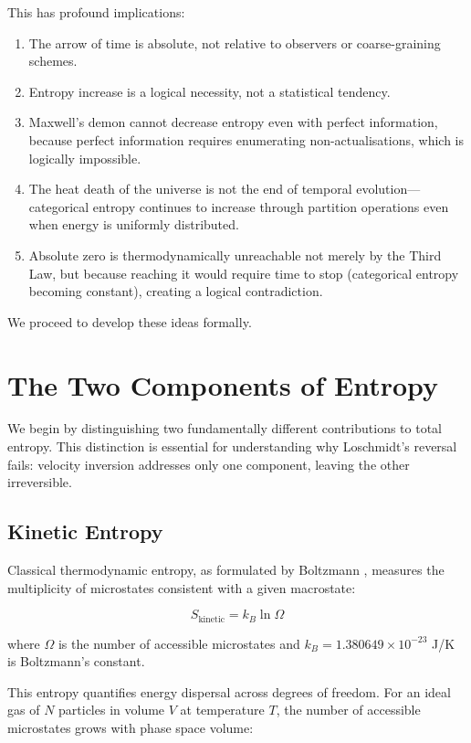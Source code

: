 \documentclass[twocolumn,10pt]{article}
\theoremstyle{definition}
\theoremstyle{remark}
\begin{document}
This has profound implications:

\begin{enumerate}
\item The arrow of time is absolute, not relative to observers or coarse-graining schemes.
\item Entropy increase is a logical necessity, not a statistical tendency.
\item Maxwell's demon \cite{maxwell1871} cannot decrease entropy even with perfect information, because perfect information requires enumerating non-actualisations, which is logically impossible.
\item The heat death of the universe is not the end of temporal evolution—categorical entropy continues to increase through partition operations even when energy is uniformly distributed.
\item Absolute zero is thermodynamically unreachable not merely by the Third Law, but because reaching it would require time to stop (categorical entropy becoming constant), creating a logical contradiction.
\end{enumerate}

We proceed to develop these ideas formally.

\section{The Two Components of Entropy}
\label{sec:two_entropies}

We begin by distinguishing two fundamentally different contributions to total entropy. This distinction is essential for understanding why Loschmidt's reversal fails: velocity inversion addresses only one component, leaving the other irreversible.

\subsection{Kinetic Entropy}

Classical thermodynamic entropy, as formulated by Boltzmann \cite{boltzmann1877}, measures the multiplicity of microstates consistent with a given macrostate:

$$
S_{\text{kinetic}} = k_B \ln \Omega
$$

where $\Omega$ is the number of accessible microstates and $k_B = 1.380649 \times 10^{-23}$ J/K is Boltzmann's constant.

This entropy quantifies energy dispersal across degrees of freedom. For an ideal gas of $N$ particles in volume $V$ at temperature $T$, the number of accessible microstates grows with phase space volume:
\end{document}
